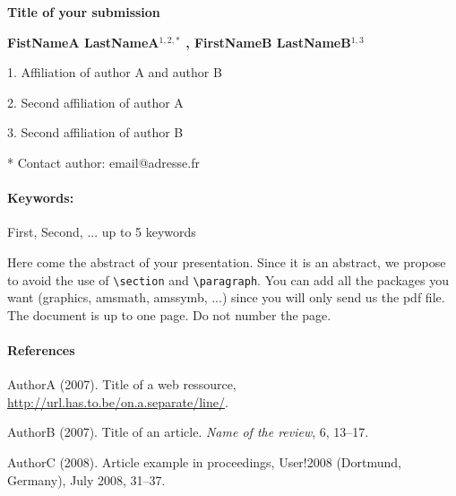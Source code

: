 \documentclass[10pt]{article}
\renewcommand{\title}[1]{\begin{center}{\bf \LARGE #1}\end{center}}
\newcommand{\keywords}{\paragraph{Keywords:}}
\begin{document}
\pagestyle{empty}

\title{Title of your submission}

\begin{center}
  {\bf FistNameA LastNameA$^{1,2,*}$ , FirstNameB LastNameB$^{1,3}$}
\end{center}

\begin{affiliations}
1. Affiliation of author A and author B \par
2. Second affiliation of author A \par
3. Second affiliation of author B \par
* Contact author: email@adresse.fr
\end{affiliations}

\keywords First, Second, ... up to 5 keywords

\vskip 0.8cm

Here come the abstract of your presentation. Since it is an abstract, we propose to avoid the use of \verb�\section� and \verb�\paragraph�. 
You can add all the packages you want (graphics, amsmath, amssymb, ...) since you will only send us the pdf file.
The document is up to one page. Do not number the page.

\paragraph{References}
\begin{description}
\item AuthorA (2007). Title of a web ressource,\\ \url{http://url.has.to.be/on.a.separate/line/}.
\item AuthorB (2007). Title of an article. \textit{Name of the review}, 6, 13--17.
\item AuthorC (2008). Article example in proceedings, User!2008 (Dortmund, Germany), July 2008, 31--37.
\end{description}

%
%
\end{document}
